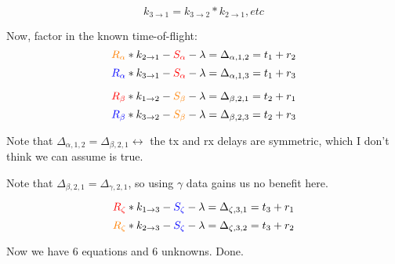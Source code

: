 \documentclass{article}
\begin{document}
\[ k_{3\rightarrow1} = k_{3\rightarrow2} * k_{2\rightarrow1}, etc \]

Now, factor in the known time-of-flight:
\[ \textcolor{orange}{R_\alpha} * k_{2\rightarrow1} - \textcolor{red}{S_\alpha} - \lambda = \Delta_{\alpha,1,2} = t_1 + r_2 \]
\[ \textcolor{blue}{R_\alpha} * k_{3\rightarrow1} - \textcolor{red}{S_\alpha} - \lambda = \Delta_{\alpha,1,3} = t_1 + r_3 \]

\[ \textcolor{red}{R_\beta} * k_{1\rightarrow2} - \textcolor{orange}{S_\beta} - \lambda = \Delta_{\beta,2,1} = t_2 + r_1 \]
\[ \textcolor{blue}{R_\beta} * k_{3\rightarrow2} - \textcolor{orange}{S_\beta} - \lambda = \Delta_{\beta,2,3} = t_2 + r_3 \]

Note that $\Delta_{\alpha,1,2} = \Delta_{\beta,2,1} \leftrightarrow$ the tx and rx delays
are symmetric, which I don't think we can assume is true.

Note that $\Delta_{\beta,2,1} = \Delta_{\gamma,2,1}$, so using $\gamma$ data
gains us no benefit here.

\[ \textcolor{red}{R_\zeta} * k_{1\rightarrow3} - \textcolor{blue}{S_\zeta} - \lambda = \Delta_{\zeta,3,1} = t_3 + r_1 \]
\[ \textcolor{orange}{R_\zeta} * k_{2\rightarrow3} - \textcolor{blue}{S_\zeta} - \lambda = \Delta_{\zeta,3,2} = t_3 + r_2 \]

Now we have 6 equations and 6 unknowns. Done.
\end{document}
